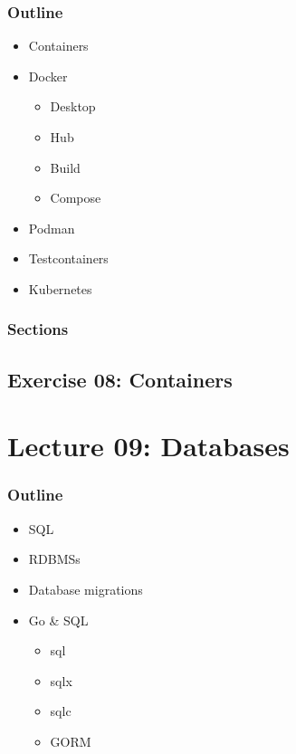 \documentclass[
  digital,
  color,
  oneside,
  nosansbold,
  nocolorbold,
  lof,
  lot,
]{fithesis4}
\begin{document}
\subsubsection{Outline}

\begin{itemize}
    \item Containers
    \item Docker
    \begin{itemize}
        \item Desktop
        \item Hub
        \item Build
        \item Compose
    \end{itemize}
    \item Podman
    \item Testcontainers
    \item Kubernetes
\end{itemize}

\subsubsection{Sections}

\subsection{Exercise 08: Containers}

\section{Lecture 09: Databases}

\subsubsection{Outline}

\begin{itemize}
    \item SQL
    \item RDBMSs
    \item Database migrations
    \item Go \& SQL
    \begin{itemize}
        \item sql
        \item sqlx
        \item sqlc
        \item GORM
    \end{itemize}
\end{itemize}
\end{document}

